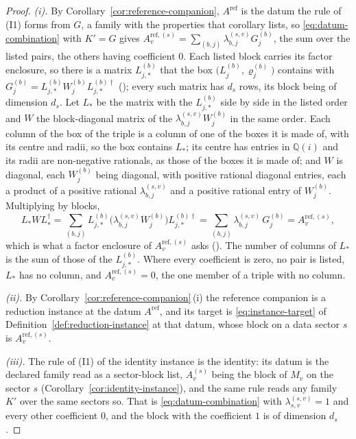 \begin{proof}
\emph{(i).} By Corollary~\ref{cor:reference-companion}, $A^{\mathrm{ref}}$ is
the datum the rule of (I1) forms from $G$, a family with the properties that
corollary lists, so \eqref{eq:datum-combination} with $K'=G$ gives
$A^{\mathrm{ref},(s)}_v=\sum_{(b,j)}\lambda^{(s,v)}_{b,j}G^{(b)}_j$, the sum
over the listed pairs, the others having coefficient $0$. Each listed block
carries its factor enclosure, so there is a matrix $L^{(b)}_{j,*}$ that the
box $\big(L^{(b)}_{j},\varrho^{(b)}_{j}\big)$ contains with
$G^{(b)}_j=L^{(b)}_{j,*}W^{(b)}_{j}L^{(b)\dagger}_{j,*}$
(); every such matrix has $d_s$ rows,
its block being of dimension $d_s$. Let $L_*$ be the matrix with the
$L^{(b)}_{j,*}$ side by side in the listed order and $W$ the block-diagonal
matrix of the $\lambda^{(s,v)}_{b,j}W^{(b)}_{j}$ in the same order. Each
column of the box of the triple is a column of one of the boxes it is made
of, with its centre and radii, so the box contains $L_*$; its centre has
entries in $\mathbb{Q}(i)$ and its radii are non-negative rationals, as
those of the boxes it is made of; and $W$ is diagonal, each
$W^{(b)}_j$ being diagonal, with positive rational diagonal entries, each a
product of a positive rational $\lambda^{(s,v)}_{b,j}$ and a positive
rational entry of $W^{(b)}_j$. Multiplying by blocks,
\begin{equation*}
  L_*WL_*^{\dagger}
  =\sum_{(b,j)}L^{(b)}_{j,*}\big(\lambda^{(s,v)}_{b,j}W^{(b)}_{j}\big)L^{(b)\dagger}_{j,*}
  =\sum_{(b,j)}\lambda^{(s,v)}_{b,j}\,G^{(b)}_j
  =A^{\mathrm{ref},(s)}_v ,
\end{equation*}
which is what a factor enclosure of $A^{\mathrm{ref},(s)}_v$ asks
(). The number of columns of $L_*$ is
the sum of those of the $L^{(b)}_{j,*}$. Where every coefficient is zero, no
pair is listed, $L_*$ has no column, and $A^{\mathrm{ref},(s)}_v=0$, the one
member of a triple with no column.

\emph{(ii).} By Corollary~\ref{cor:reference-companion}\,(i) the reference
companion is a reduction instance at the datum $A^{\mathrm{ref}}$, and its
target is \eqref{eq:instance-target} of
Definition~\ref{def:reduction-instance} at that datum, whose block on a data
sector $s$ is $A^{\mathrm{ref},(s)}_v$.

\emph{(iii).} The rule of (I1) of the identity instance is the identity: its
datum is the declared family read as a sector-block list,
$A^{(s)}_v$ being the block of $M_v$ on the sector $s$
(Corollary~\ref{cor:identity-instance}), and the same rule reads any family
$K'$ over the same sectors so. That is \eqref{eq:datum-combination} with
$\lambda^{(s,v)}_{s,v}=1$ and every other coefficient $0$, and the block
with the coefficient $1$ is of dimension $d_s$.
\end{proof}
